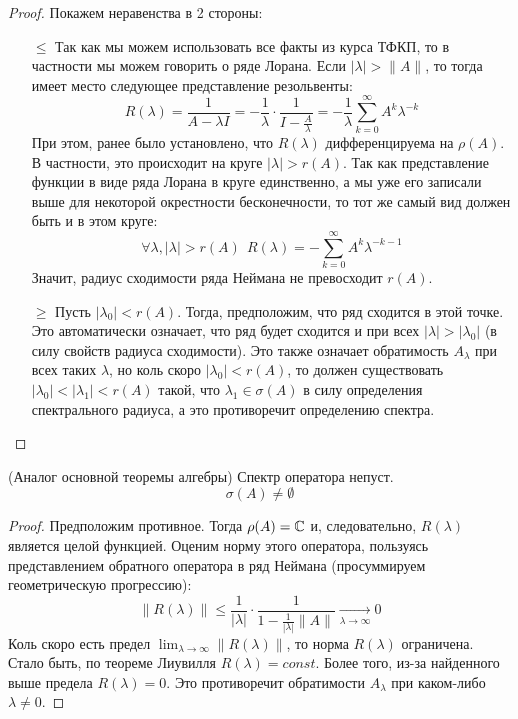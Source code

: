 \begin{proof}
	Покажем неравенства в 2 стороны:
	\begin{itemize}
		\item[$\le$] Так как мы можем использовать все факты из курса ТФКП, то в частности мы можем говорить о ряде Лорана. Если $|\lambda| > \|A\|$, то тогда имеет место следующее представление резольвенты:
		\[
			R(\lambda) = \frac{1}{A - \lambda I} = -\frac{1}{\lambda} \cdot \frac{1}{I - \frac{A}{\lambda}} = -\frac{1}{\lambda}\sum_{k = 0}^\infty A^k\lambda^{-k}
		\]
		При этом, ранее было установлено, что $R(\lambda)$ дифференцируема на $\rho(A)$. В частности, это происходит на круге $|\lambda| > r(A)$. Так как представление функции в виде ряда Лорана в круге единственно, а мы уже его записали выше для некоторой окрестности бесконечности, то тот же самый вид должен быть и в этом круге:
		\[
			\forall \lambda, |\lambda| > r(A)\ \ R(\lambda) = -\sum_{k = 0}^\infty A^k\lambda^{-k - 1}
		\]
		Значит, радиус сходимости ряда Неймана не превосходит $r(A)$.
		
		\item[$\ge$] Пусть $|\lambda_0| < r(A)$. Тогда, предположим, что ряд сходится в этой точке. Это автоматически означает, что ряд будет сходится и при всех $|\lambda| > |\lambda_0|$ (в силу свойств радиуса сходимости). Это также означает обратимость $A_\lambda$ при всех таких $\lambda$, но коль скоро $|\lambda_0| < r(A)$, то должен существовать $|\lambda_0| < |\lambda_1| < r(A)$ такой, что $\lambda_1 \in \sigma(A)$ в силу определения спектрального радиуса, а это противоречит определению спектра.
	\end{itemize}
\end{proof}

\begin{proposition} (Аналог основной теоремы алгебры)
	Спектр оператора непуст.
	\[
		\sigma(A) \neq \emptyset
	\]
\end{proposition}

\begin{proof}
	Предположим противное. Тогда $\rho(A) = \mathbb{C}$ и, следовательно, $R(\lambda)$ является целой функцией. Оценим норму этого оператора, пользуясь представлением обратного оператора в ряд Неймана (просуммируем геометрическую прогрессию):
	\[
		\|R(\lambda)\| \le \frac{1}{|\lambda|} \cdot \frac{1}{1 - \frac{1}{|\lambda|}\|A\|} \xrightarrow[\lambda \to \infty]{} 0
	\]
	Коль скоро есть предел $\lim_{\lambda \to \infty} \|R(\lambda)\|$, то норма $R(\lambda)$ ограничена. Стало быть, по теореме Лиувилля $R(\lambda) = const$. Более того, из-за найденного выше предела $R(\lambda) = 0$. Это противоречит обратимости $A_\lambda$ при каком-либо $\lambda \neq 0$.
\end{proof}


